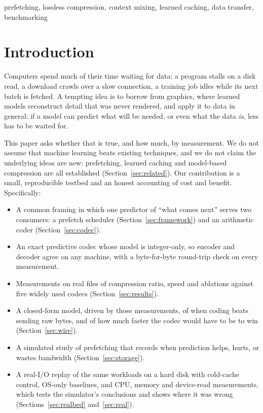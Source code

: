 \documentclass[conference]{IEEEtran}
\begin{document}
\begin{IEEEkeywords}
prefetching, lossless compression, context mixing, learned caching, data transfer, benchmarking
\end{IEEEkeywords}

\section{Introduction}
Computers spend much of their time waiting for data: a program stalls on a disk read, a download crawls over a slow connection, a training job idles while its next batch is fetched. A tempting idea is to borrow from graphics, where learned models reconstruct detail that was never rendered, and apply it to data in general: if a model can predict what will be needed, or even what the data \emph{is}, less has to be waited for.

This paper asks whether that is true, and how much, by measurement. We do not assume that machine learning beats existing techniques, and we do not claim the underlying ideas are new: prefetching, learned caching and model-based compression are all established (Section~\ref{sec:related}). Our contribution is a small, reproducible testbed and an honest accounting of cost and benefit. Specifically:
\begin{itemize}
\item A common framing in which one predictor of ``what comes next'' serves two consumers: a prefetch scheduler (Section~\ref{sec:framework}) and an arithmetic coder (Section~\ref{sec:codec}).
\item An exact predictive codec whose model is integer-only, so encoder and decoder agree on any machine, with a byte-for-byte round-trip check on every measurement.
\item Measurements on real files of compression ratio, speed and ablations against five widely used codecs (Section~\ref{sec:results}).
\item A closed-form model, driven by those measurements, of when coding beats sending raw bytes, and of how much faster the codec would have to be to win (Section~\ref{sec:wire}).
\item A simulated study of prefetching that records when prediction helps, hurts, or wastes bandwidth (Section~\ref{sec:storage}).
\item A real-I/O replay of the same workloads on a hard disk with cold-cache control, OS-only baselines, and CPU, memory and device-read measurements, which tests the simulator's conclusions and shows where it was wrong (Sections~\ref{sec:realbed} and~\ref{sec:real}).
\end{itemize}
\end{document}

